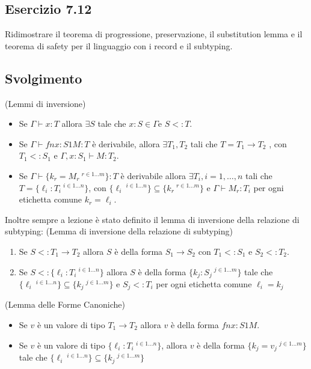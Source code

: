 \subsection*{Esercizio 7.12}
Ridimostrare il teorema di progressione, preservazione, il substitution lemma e il teorema
di safety per il linguaggio con i record e il subtyping. 

\subsection*{Svolgimento}

(Lemmi di inversione)
\begin{itemize}
	\item Se $\Gamma \vdash x : T$ allora $\exists S$ tale che $x : S \in \Gamma $e $S <: T$.
	\item Se $\Gamma \vdash fn x:S1M : T$ \`e derivabile, allora $\exists T_1, T_2$ tali che $T = T_1 \rightarrow T_2$ , con $T_1 <: S_1$ e
	$\Gamma, x : S_1 \vdash M : T_2$.
	\item Se $\Gamma \vdash \{k_r = M_r\ ^{r \in 1\dots m}\} : T$ \`e derivabile allora
	$\exists T_i, i = 1, \dots, n$ tali che $T = \{\ell_i : T_i\ ^{i \in 1\dots n}\}$,
	con $\{\ell_i\ ^{i \in 1 \dots n}\} \subseteq \{k_r\ ^{r \in 1 \dots m} \}$
	e $\Gamma \vdash M_r : T_i$ per ogni etichetta comune $k_r = \ell_i$.
\end{itemize}

Inoltre sempre a lezione \`e stato definito il lemma di inversione della relazione di subtyping:
(Lemma di inversione della relazione di subtyping)
	\begin{enumerate}
	\item Se $S <: T_1 \rightarrow T_2$ allora $S$ \`e della forma $S_1 \rightarrow S_2$ con $T_1 <: S_1$ e $S_2 <: T_2$.
	\item Se $S <: \{\ell_i : T_i\ ^{i \in 1 \dots n} \}$ allora $S$ \`e della forma
	$\{k_j : S_j\ ^{j \in 1 \dots m} \}$ tale che $\{\ell_i\ ^{i \in 1 \dots n}\} \subseteq \{k_j\ ^{j \in 1 \dots m} \}$ e $S_j <: T_i$ per ogni etichetta comune
	$\ell_i = k_j$
	\end{enumerate}

(Lemma delle Forme Canoniche)
\begin{itemize}
 \item Se $v$ \`e un valore di tipo $T_1 \rightarrow T_2$ allora $v$ \`e della forma $fn x:S1M$.
 \item Se $v$ \`e un valore di tipo $\{\ell_i:T_i\ ^{i \in 1 \dots n}\}$, allora $v$ \`e della forma $\{k_j = v_j\ ^{j \in 1 \dots m} \}$
 tale che $\{\ell_i\ ^{i \in 1 \dots n} \} \subseteq \{k_j\ ^{j \in 1 \dots m}\}$
\end{itemize}


